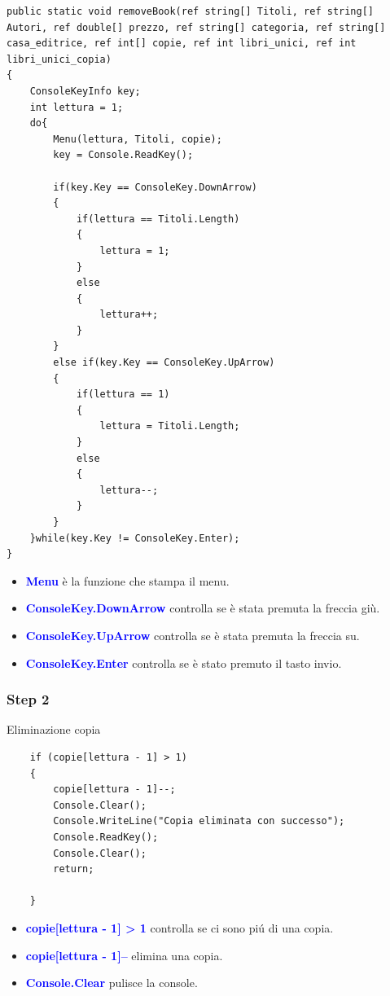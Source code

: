 \documentclass[a4paper,12pt]{article}
\begin{document}
\begin{lstlisting}
public static void removeBook(ref string[] Titoli, ref string[] Autori, ref double[] prezzo, ref string[] categoria, ref string[] casa_editrice, ref int[] copie, ref int libri_unici, ref int libri_unici_copia)
{
    ConsoleKeyInfo key;
    int lettura = 1;
    do{
        Menu(lettura, Titoli, copie);
        key = Console.ReadKey();

        if(key.Key == ConsoleKey.DownArrow)
        {
            if(lettura == Titoli.Length)
            {
                lettura = 1;
            }
            else
            {
                lettura++;
            }
        }
        else if(key.Key == ConsoleKey.UpArrow)
        {
            if(lettura == 1)
            {
                lettura = Titoli.Length;
            }
            else
            {
                lettura--;
            }
        }
    }while(key.Key != ConsoleKey.Enter);
}
\end{lstlisting}

\begin{itemize}
    \item \textcolor{blue}{\textbf{Menu}} è la funzione che stampa il menu.
    \item \textcolor{blue}{\textbf{ConsoleKey.DownArrow}} controlla se è stata premuta la freccia giù.
    \item \textcolor{blue}{\textbf{ConsoleKey.UpArrow}} controlla se è stata premuta la freccia su.
    \item \textcolor{blue}{\textbf{ConsoleKey.Enter}} controlla se è stato premuto il tasto invio.
\end{itemize}

\subsubsection{Step 2}

Eliminazione copia

\begin{lstlisting}
    if (copie[lettura - 1] > 1)
    {
        copie[lettura - 1]--;
        Console.Clear();
        Console.WriteLine("Copia eliminata con successo");
        Console.ReadKey();
        Console.Clear();
        return;

    }
\end{lstlisting}

\begin{itemize}
    \item \textcolor{blue}{\textbf{copie[lettura - 1] > 1}} controlla se ci sono piú di una copia.
    \item \textcolor{blue}{\textbf{copie[lettura - 1]--}} elimina una copia.
    \item \textcolor{blue}{\textbf{Console.Clear}} pulisce la console.
\end{itemize}
\end{document}

